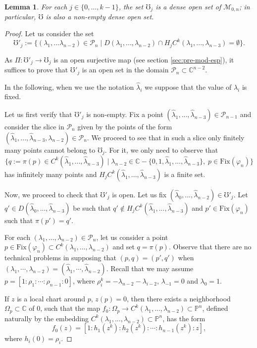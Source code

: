 \documentclass{amsart}
\newcommand{\HC}[4]{\ensuremath{H_{#1}C^{#2}(#4_1,...,#4_{#3})}}
\newcommand{\C}[3]{\ensuremath{C^{#1}(#3_1,...,#3_{#2})}}
\newtheorem{lemma}[theorem]{Lemma}
\begin{document}
 
\begin{lemma}\label{le:open-zariski}
For each $j \in \{0,\ldots,k-1\}$, the set  $\mho_j$ is a  dense open set of  $\mathcal{M}_{0,n}$; in particular, $\mho$ is also a non-empty dense open set.
\end{lemma}
\begin{proof}
Let us consider the set 
$$\mho'_j:=\{(\lambda_1,...\lambda_{n-2})\in\mathcal{P}_n \mid D(\lambda_1,...,
\lambda_{n-2})\cap \HC{j}{k}{n-3}{\lambda}=\emptyset \}.$$  

As  $\Pi: \mho'_j\rightarrow \mho_j$ is an open  surjective map 
(see section  \ref{sec:pre-mod-esp}), it suffices to prove that $\mho'_j$ is an open set in the domain ${\mathcal P}_{n} \subset {\mathbb C}^{n-2}$.

In the following, when we use the notation $\hat{\lambda}_i$ we suppose that the value of $\lambda_i$ is fixed.

Let us first verify that $\mho'_j$ is non-empty.  Fix a point $(\hat{\lambda}_1,...,\hat{\lambda}_{n-3}) 
\in {\mathcal P}_{n-1}$ and consider the slice in ${\mathcal P}_{n}$ given by the points of the form
$(\hat{\lambda}_1,...,\hat{\lambda}_{n-3}, \lambda_{n-2}) \in {\mathcal P}_{n}$. We proceed to see that 
in such a slice only finitely many points cannot belong to $\mho_{j}$. For it, we only need to observe that 
$$\{q:=\pi(p)\in \C{k}{n-3}{\hat{\lambda}}\mid \lambda_{n-2}\in {\mathbb{C}}-\{0,1, \hat{\lambda}_1,...,\hat{\lambda}_{n-3} \},\; p\in {\mathrm{Fix}}{(\varphi_n)}\}$$
 has infinitely many points and $\HC{j}{k}{n-3}{\hat{\lambda}}$ is a finite set.    


Now, we proceed to check that $\mho'_{j}$ is open.  
Let us fix $(\hat{\lambda}_0,...,\hat{\lambda}_{n-2}) \in \mho'_{j}$. 
Let $q'\in D(\hat{\lambda}_0,...,\hat{\lambda}_{n-3})$ be such that $q'\not\in \HC{j}{k}{n-3}{\hat{\lambda}}$ and 
$p'\in {\mathrm{Fix}}{(\varphi_n)}$ such that $\pi(p')=q'$. 

For each $(\lambda_{1},\ldots,\lambda_{n-2}) \in {\mathcal P}_{n}$, let us consider a point 
$p\in {\mathrm{Fix}}{(\varphi_{n})}\subset \C{k}{n-2}{\lambda}$ and set $q=\pi(p)$. 
Observe that there are no technical problems in supposing that $(p,q)=(p',q')$ 
when  $(\lambda_{1},\cdots, \lambda_{n-2})=(\hat{\lambda}_{1},\cdots, \hat{\lambda}_{n-2})$. 
Recall that we may assume $p=[1:\rho_1:\cdots :\rho_{n-1}:0]$, where $\rho_i^k=-\lambda_{n-2}-\lambda_{i-2}$,  $\lambda_{-1}=0$ and $\lambda_{0}=1$.

If $z$ is a local chart around $p$, $z(p)=0$, then there exists a neighborhood $\Omega_p  \subset {\mathbb{C}}$ of $0$,  such that the map $f_0:\Omega_p \rightarrow \C{k}{n-2}{\lambda}\subset {\mathbb{P}}^{n}$, defined naturally by the embedding $\C{k}{n-2}{\lambda}\subset {\mathbb{P}}^{n}$, has the form
$$ \displaystyle f_0(z)=[1:h_1(z^{k}):h_2(z^{k}): \cdots: h_{n-1}(z^{k}):z],$$ 
where $h_i(0)=\rho_{i}$.


\end{proof}
\end{document}
